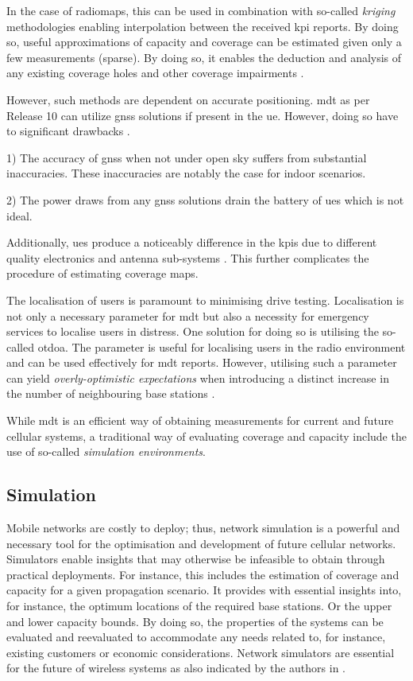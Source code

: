 In the case of radiomaps, this can be used in combination with so-called \emph{kriging} methodologies enabling interpolation between the received \gls{kpi} reports. By doing so, useful approximations of capacity and coverage can be estimated given only a few measurements (sparse). By doing so, it enables the deduction and analysis of any existing coverage holes and other coverage impairments \cite{Bi2018EngineeringManagement}. 

However, such methods are dependent on accurate positioning. \gls{mdt} as per Release 10 \cite{3GPP2017} can utilize \gls{gnss} solutions if present in the \gls{ue}. However, doing so have to significant drawbacks \cite{Schloemann2016}. 

1) The accuracy of \gls{gnss} when not under open sky suffers from substantial inaccuracies. These inaccuracies are notably the case for indoor scenarios. 

2) The power draws from any \gls{gnss} solutions drain the battery of \glspl{ue} which is not ideal. 

Additionally, \glspl{ue} produce a noticeably difference in the \glspl{kpi} due to different quality electronics and antenna sub-systems \cite{Karstensen2017}. This further complicates the procedure of estimating coverage maps.

The localisation of users is paramount to minimising drive testing. Localisation is not only a necessary parameter for \gls{mdt} but also a necessity for emergency services to localise users in distress. One solution for doing so is utilising the so-called \gls{otdoa}. The parameter is useful for localising users in the radio environment \cite{Johansson2012} and can be used effectively for \gls{mdt} reports. However, utilising such a parameter can yield \emph{overly-optimistic expectations} when introducing a distinct increase in the number of neighbouring base stations \cite{Sivers2015, Schloemann2016}. 

While \gls{mdt} is an efficient way of obtaining measurements for current and future cellular systems, a traditional way of evaluating coverage and capacity include the use of so-called \emph{simulation environments}. 

\subsection{Simulation}
Mobile networks are costly to deploy; thus, network simulation is a powerful and necessary tool for the optimisation and development of future cellular networks. Simulators enable insights that may otherwise be infeasible to obtain through practical deployments. For instance, this includes the estimation of coverage and capacity for a given propagation scenario. It provides with essential insights into, for instance, the optimum locations of the required base stations. Or the upper and lower capacity bounds. By doing so, the properties of the systems can be evaluated and reevaluated to accommodate any needs related to, for instance, existing customers or economic considerations. Network simulators are essential for the future of wireless systems as also indicated by the authors in \cite{Cavalcanti2017}. 

